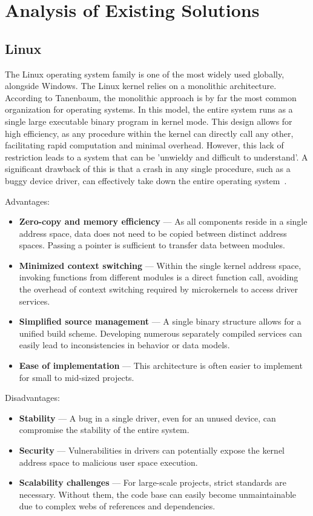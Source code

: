 \documentclass[a4paper,10pt,twoside]{report}
\theoremstyle{definition}
\begin{document}
\chapter{Analysis of Existing Solutions}

\section{Linux}
\label{sec:linux-research}

The Linux operating system family is one of the most widely used globally, alongside Windows. The Linux kernel relies on a monolithic architecture. According to Tanenbaum, the monolithic approach is by far the most common organization for operating systems. In this model, the entire system runs as a single large executable binary program in kernel mode. This design allows for high efficiency, as any procedure within the kernel can directly call any other, facilitating rapid computation and minimal overhead. However, this lack of restriction leads to a system that can be 'unwieldy and difficult to understand'. A significant drawback of this is that a crash in any single procedure, such as a buggy device driver, can effectively take down the entire operating system~\cite{tanenbaum2015modern}.

\noindent Advantages:
\begin{itemize}
    \item \textbf{Zero-copy and memory efficiency} --- As all components reside in a single address space, data does not need to be copied between distinct address spaces. Passing a pointer is sufficient to transfer data between modules.
    \item \textbf{Minimized context switching} --- Within the single kernel address space, invoking functions from different modules is a direct function call, avoiding the overhead of context switching required by microkernels to access driver services.
    \item \textbf{Simplified source management} --- A single binary structure allows for a unified build scheme. Developing numerous separately compiled services can easily lead to inconsistencies in behavior or data models.
    \item \textbf{Ease of implementation} --- This architecture is often easier to implement for small to mid-sized projects.
\end{itemize}

\noindent Disadvantages:
\begin{itemize}
    \item \textbf{Stability} --- A bug in a single driver, even for an unused device, can compromise the stability of the entire system.
    \item \textbf{Security} --- Vulnerabilities in drivers can potentially expose the kernel address space to malicious user space execution.
    \item \textbf{Scalability challenges} --- For large-scale projects, strict standards are necessary. Without them, the code base can easily become unmaintainable due to complex webs of references and dependencies.
\end{itemize}
\end{document}
